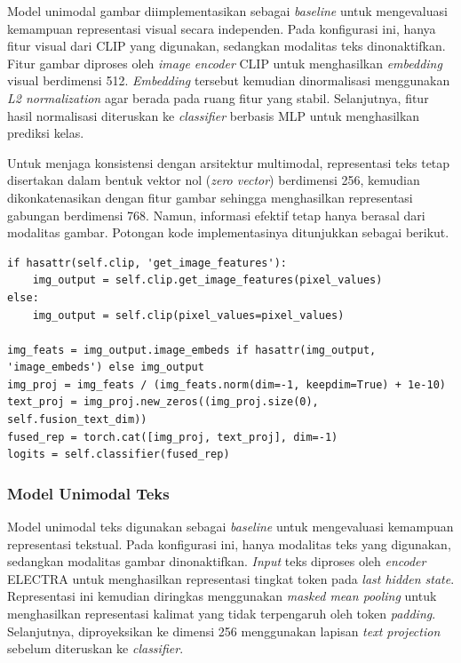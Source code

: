 Model unimodal gambar diimplementasikan sebagai \textit{baseline} untuk mengevaluasi kemampuan representasi visual secara independen. Pada konfigurasi ini, hanya fitur visual dari CLIP yang digunakan, sedangkan modalitas teks dinonaktifkan. Fitur gambar diproses oleh \textit{image encoder} CLIP untuk menghasilkan \textit{embedding} visual berdimensi 512. \textit{Embedding} tersebut kemudian dinormalisasi menggunakan \textit{L2 normalization} agar berada pada ruang fitur yang stabil. Selanjutnya, fitur hasil normalisasi diteruskan ke \textit{classifier} berbasis MLP untuk menghasilkan prediksi kelas.

Untuk menjaga konsistensi dengan arsitektur multimodal, representasi teks tetap disertakan dalam bentuk vektor nol (\textit{zero vector}) berdimensi 256, kemudian dikonkatenasikan dengan fitur gambar sehingga menghasilkan representasi gabungan berdimensi 768. Namun, informasi efektif tetap hanya berasal dari modalitas gambar. Potongan kode implementasinya ditunjukkan sebagai berikut.

\begin{lstlisting}[caption={Kode Implementasi Model Unimodal Gambar}, label={code:4.unimodal_gambar}]
if hasattr(self.clip, 'get_image_features'):
    img_output = self.clip.get_image_features(pixel_values)
else:
    img_output = self.clip(pixel_values=pixel_values)

img_feats = img_output.image_embeds if hasattr(img_output, 'image_embeds') else img_output
img_proj = img_feats / (img_feats.norm(dim=-1, keepdim=True) + 1e-10)
text_proj = img_proj.new_zeros((img_proj.size(0), self.fusion_text_dim))
fused_rep = torch.cat([img_proj, text_proj], dim=-1)
logits = self.classifier(fused_rep)
\end{lstlisting}

\subsubsection{Model Unimodal Teks}
\label{IV.Model.Konfigurasi.UnimodalTeks}

Model unimodal teks digunakan sebagai \textit{baseline} untuk mengevaluasi kemampuan representasi tekstual. Pada konfigurasi ini, hanya modalitas teks yang digunakan, sedangkan modalitas gambar dinonaktifkan. \textit{Input} teks diproses oleh \textit{encoder} ELECTRA untuk menghasilkan representasi tingkat token pada \textit{last hidden state}. Representasi ini kemudian diringkas menggunakan \textit{masked mean pooling} untuk menghasilkan representasi kalimat yang tidak terpengaruh oleh token \textit{padding}. Selanjutnya,  diproyeksikan ke dimensi 256 menggunakan lapisan \textit{text projection} sebelum diteruskan ke \textit{classifier}.

